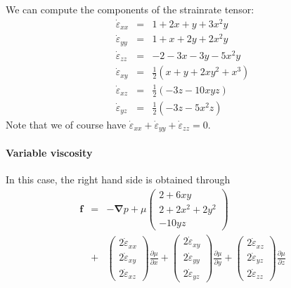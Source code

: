 We can compute the components of the strainrate tensor:
\begin{eqnarray}
\dot{\varepsilon}_{xx} &=& 1+2x+y+3x^2y\\
\dot{\varepsilon}_{yy} &=& 1+x+2y+2x^2y\\
\dot{\varepsilon}_{zz} &=& -2-3x-3y-5x^2y\\ 
\dot{\varepsilon}_{xy} &=&  \frac{1}{2} (x+y+2xy^2+x^3)\\
\dot{\varepsilon}_{xz} &=&  \frac{1}{2} (-3z-10xyz  )\\
\dot{\varepsilon}_{yz} &=&  \frac{1}{2} ( -3z -5x^2z )
\end{eqnarray}
Note that we of course have $\dot{\varepsilon}_{xx} +\dot{\varepsilon}_{yy} 
+\dot{\varepsilon}_{zz} =0$.

\paragraph{Variable viscosity}

In this case, the right hand side is obtained through
\begin{eqnarray}
{\bm f} &=& -{\bm \nabla p} + 
\mu
\left(
\begin{array}{c}
2+6xy \\
2+2x^2+2y^2 \\
-10yz
\end{array}
\right) \nonumber\\
&+&
\left(
\begin{array}{c}
2 \dot{\varepsilon}_{xx} \\
2 \dot{\varepsilon}_{xy} \\
2 \dot{\varepsilon}_{xz}
\end{array}
\right) \frac{\partial \mu}{\partial x}
+
\left(
\begin{array}{c}
2 \dot{\varepsilon}_{xy} \\
2 \dot{\varepsilon}_{yy} \\
2 \dot{\varepsilon}_{yz}
\end{array}
\right) \frac{\partial \mu}{\partial y}
+
\left(
\begin{array}{c}
2 \dot{\varepsilon}_{xz} \\
2 \dot{\varepsilon}_{yz} \\
2 \dot{\varepsilon}_{zz} 
\end{array}
\right) \frac{\partial \mu}{\partial z}
\end{eqnarray}


